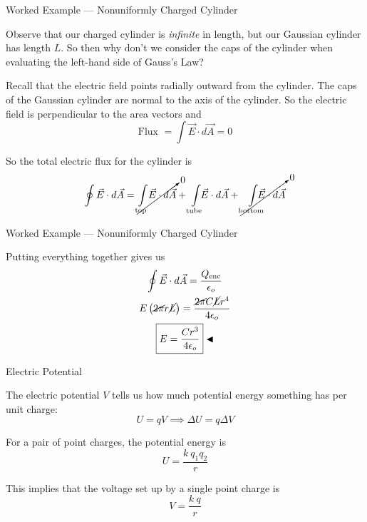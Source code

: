 \documentclass{beamer}
\begin{document}
\begin{frame}{Worked Example --- Nonuniformly Charged Cylinder}

Observe that our charged cylinder is \emph{infinite} in length, but our Gaussian cylinder has length $L$. So then why don't we consider the caps of the cylinder when evaluating the left-hand side of Gauss's Law?

\vfill

Recall that the electric field points radially outward from the cylinder. The caps of the Gaussian cylinder are normal to the axis of the cylinder. So the electric field is perpendicular to the area vectors and
\begin{equation*}
    \text{Flux } = \int \vec{E} \cdot d\vec{A} = 0
\end{equation*}

So the total electric flux for the cylinder is
\begin{equation*}
    \oint \vec{E} \cdot d\vec{A} = \cancelto{0}{\int\limits_{\text{top}} \hspace{-0.2em} \vec{E} \cdot d\vec{A}} + \int\limits_{\text{tube}} \hspace{-0.5em} \vec{E} \cdot d\vec{A} + \cancelto{0}{\int\limits_{\text{bottom}} \hspace{-1em} \vec{E} \cdot d\vec{A}}
\end{equation*}

\end{frame}

\begin{frame}{Worked Example --- Nonuniformly Charged Cylinder}

Putting everything together gives us
\begin{gather*}
    \oint \vec{E} \cdot d\vec{A} = \frac{Q_{\text{enc}}}{\epsilon_o} \\
    E \left( \cancel{2\pi} r \cancel{L} \right) = \frac{\cancel{2\pi} C \cancel{L} r^4}{4\epsilon_o} \\
    \boxed{E = \frac{C r^3}{4\epsilon_o}} \blacktriangleleft
\end{gather*}

\end{frame}

\begin{frame}{Electric Potential}

The electric potential $V$ tells us how much potential energy something has per unit charge:
\begin{equation*}
	U = q V \implies \boxed{\Delta U = q \Delta V}
\end{equation*}

For a pair of point charges, the potential energy is
\begin{equation*}
	U = \frac{k\ q_1 q_2}{r}
\end{equation*}

This implies that the voltage set up by a single point charge is
\begin{equation*}
	V = \frac{k\ q}{r}
\end{equation*}

\end{frame}
\end{document}
